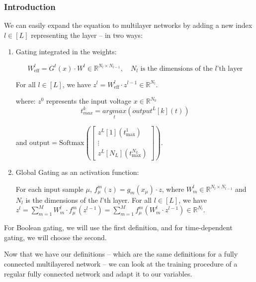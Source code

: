 \subsubsection{Introduction}

We can easily expand the equation to multilayer networks by adding a new index $l \in [L]$ representing the layer – in two ways:

\begin{enumerate}
    \item Gating integrated in the weights:


\begin{equation}
    W_{\text{eff}}^l = G^t(x) \cdot W^l \in \mathbb{R}^{N_l \times N_{l-1}}, \quad N_l \text{ is the dimensions of the } l\text{'th layer}
\end{equation}

For all $l \in [L]$, we have $z^l = W_{\text{eff}}^l \cdot z^{l-1} \in \mathbb{R}^{N_l}$.

where:
$z^0$ represents the input voltage $x \in \mathbb{R}^{N_0}$
\begin{equation}
    t^k_{max} = \underset{t}{argmax} \left( 
    output^L[k](t)
    \right)
\end{equation}


and ${\text{output}} = \text{Softmax}\left(\begin{bmatrix} z^L[1](t_{\text{max}}^1) \\ \vdots \\ z^L[N_L](t_{\text{max}}^{N_L}) \end{bmatrix}\right)$.
    \item Global Gating as an activation function:

For each input sample $\mu$, $f_\mu^m(z) = g_m(x_\mu) \cdot z$,
where $W_m^l \in \mathbb{R}^{N_l \times N_{l-1}}$ and $N_l$ is the dimensions of the $l$'th layer.
For all $l \in [L]$, we have $z^l = \sum_{m=1}^M W_m^l \cdot f_\mu^m(z^{l-1}) = \sum_{m=1}^M f_\mu^m(W_m^l \cdot z^{l-1}) \in \mathbb{R}^{N_l}$.

\end{enumerate}

For Boolean gating, we will use the first definition, and for time-dependent gating, we will choose the second.

Now that we have our definitions – which are the same definitions for a fully connected multilayered network – we can look at the training procedure of a regular fully connected network and adapt it to our variables.
